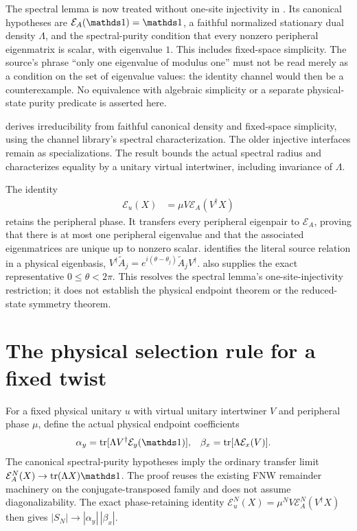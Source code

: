 \documentclass[11pt]{article}
\begin{document}
The spectral lemma is now treated without one-site injectivity in
.
Its canonical hypotheses are $\mathcal E_A(\Id)=\Id$, a faithful normalized
stationary dual density $\Lambda$, and the spectral-purity condition
that every nonzero peripheral eigenmatrix is scalar, with eigenvalue $1$.
This includes fixed-space simplicity. The source's phrase ``only one
eigenvalue of modulus one'' must not be read merely as a condition on the
set of eigenvalue values: the identity channel would then be a counterexample.
No equivalence with algebraic simplicity or a separate physical-state
purity predicate is asserted here.

 derives
irreducibility from faithful canonical density and fixed-space simplicity,
using the channel library's spectral characterization. The older injective
interfaces remain as specializations. The result bounds the actual spectral
radius and characterizes equality by a unitary virtual intertwiner,
including invariance of $\Lambda$.

The identity
\begin{align}
    \mathcal E_u(X) & =\mu V\mathcal E_A(V^\dagger X)
\end{align}
retains the peripheral phase. It transfers every peripheral eigenpair to
$\mathcal E_A$, proving that there is at most one peripheral eigenvalue
and that the associated eigenmatrices are unique up to nonzero scalar.
 identifies the
literal source relation in a physical eigenbasis,
$V^\dagger\widetilde A_j=e^{i(\theta-\theta_j)}
    \widetilde A_jV^\dagger$.
also supplies the exact representative $0\leq\theta<2\pi$.
This resolves the spectral lemma's one-site-injectivity restriction;
it does not establish the physical endpoint theorem or the reduced-state
symmetry theorem.

\section{The physical selection rule for a fixed twist}

For a fixed physical unitary $u$ with virtual unitary intertwiner $V$ and
peripheral phase $\mu$, define the actual physical endpoint coefficients
\begin{align}
    \alpha_y & =\tr[\Lambda V^\dagger\mathcal E_y(\Id)], &
    \beta_x  & =\tr[\Lambda\mathcal E_x(V)].
\end{align}
The canonical spectral-purity hypotheses imply the ordinary transfer limit
$\mathcal E_A^N(X)\to\tr(\Lambda X)\Id$. The proof reuses the existing
FNW remainder machinery on the conjugate-transposed family and does not
assume diagonalizability. The exact phase-retaining identity
$\mathcal E_u^N(X)=\mu^N V\mathcal E_A^N(V^\dagger X)$ then gives
$|S_N|\to|\alpha_y|\,|\beta_x|$.
\end{document}
